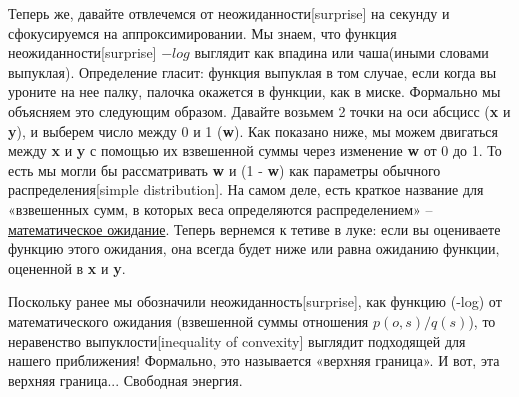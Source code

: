 \documentclass[twoside,leqno, 11pt]{article}
\begin{document}
	Теперь же, давайте отвлечемся от неожиданности[surprise] на секунду и сфокусируемся на аппроксимировании. Мы знаем, что функция неожиданности[surprise] $-log$ выглядит как впадина или чаша(иными словами выпуклая). Определение гласит: функция выпуклая в том случае, если когда вы уроните на нее палку, палочка окажется в функции, как в миске. Формально мы объясняем это следующим образом. Давайте возьмем 2 точки на оси абсцисс (\textbf{x} и \textbf{y}), и выберем число между 0 и 1 (\textbf{w}). Как показано ниже, мы можем двигаться между \textbf{x} и \textbf{y} с помощью их взвешенной суммы через изменение \textbf{w} от 0 до 1. То есть мы могли бы рассматривать \textbf{w} и (1 - \textbf{w}) как параметры обычного распределения[simple distribution]. На самом деле, есть краткое название для «взвешенных сумм, в которых веса определяются распределением» -- \href{https://en.wikipedia.org/wiki/Expected_value}{математическое ожидание}. Теперь вернемся к тетиве в луке: если вы оцениваете функцию этого ожидания, она всегда будет ниже или равна ожиданию функции, оцененной в \textbf{x} и \textbf{y}.
	
	\begin{figure}[h]
		\label{ris:image}
	\end{figure}
	
	Поскольку ранее мы обозначили неожиданность[surprise], как функцию (-log) от математического ожидания (взвешенной суммы отношения $p(o, s) / q(s)$), то неравенство выпуклости[inequality of convexity] выглядит подходящей для нашего приближения! Формально, это называется «верхняя граница». И вот, эта верхняя граница... Свободная энергия.
	
	\begin{figure}[h]
		\label{ris:image}
	\end{figure}
	
\end{document}
